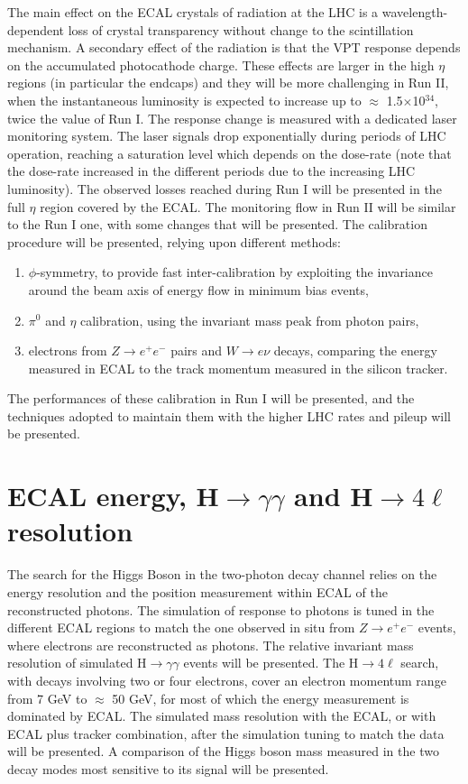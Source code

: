 \documentclass[11pt]{article}
\begin{document}
\begin{multicols}{2}
The main effect on the ECAL crystals of radiation at the LHC is a
wavelength-dependent loss of crystal transparency without change to
the scintillation mechanism.  A secondary effect of the radiation is
that the VPT response depends on the accumulated photocathode charge.
These effects are larger in the high $\eta$ regions (in particular the
endcaps) and they will be more challenging in Run II, when the
instantaneous luminosity is expected to increase up to $\approx$
1.5$\times$10$^{34}$, twice the value of Run I. The response change is
measured with a dedicated laser monitoring system. The laser signals
drop exponentially during periods of LHC operation, reaching a
saturation level which depends on the dose-rate (note that the
dose-rate increased in the different periods due to the increasing LHC
luminosity). The observed losses reached during Run I will be
presented in the full $\eta$ region covered by the ECAL. The
monitoring flow in Run II will be similar to the Run I one, with some
changes that will be presented.  The calibration procedure will be
presented, relying upon different methods: 
\begin{enumerate}
\item $\phi$-symmetry, to provide fast inter-calibration by
  exploiting the invariance around the beam axis of energy flow in
  minimum bias events,
\item $\pi^0$ and $\eta$ calibration, using the invariant mass peak
  from photon pairs,
\item electrons from $Z\to e^+e^-$ pairs and $W\to e\nu$ decays,
  comparing the energy measured in ECAL to the track momentum measured
  in the silicon tracker.
\end{enumerate}
The performances of these calibration in Run I will be presented, and
the techniques adopted to maintain them with the higher LHC rates and
pileup will be presented.

\section{ECAL energy, H$\to\gamma\gamma$ and H$\to4\ell$ resolution}
The search for the Higgs Boson in the two-photon decay channel relies
on the energy resolution and the position measurement within ECAL of
the reconstructed photons. The simulation of response to photons is
tuned in the different ECAL regions to match the one observed in situ
from $Z\to e^+e^-$ events, where electrons are reconstructed as
photons.  The relative invariant mass resolution of simulated
H$\to\gamma\gamma$ events will be presented.  The H$\to4\ell$ search,
with decays involving two or four electrons, cover an electron
momentum range from 7 GeV to $\approx$ 50 GeV, for most of which the
energy measurement is dominated by ECAL.  The simulated mass
resolution with the ECAL, or with ECAL plus tracker combination, after
the simulation tuning to match the data will be presented. A
comparison of the Higgs boson mass measured in the two decay modes
most sensitive to its signal will be presented.


\end{multicols}
\end{document}
